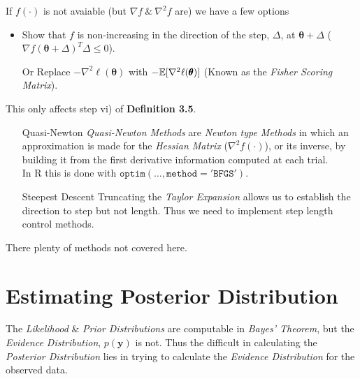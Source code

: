 \documentclass[11pt,a4paper]{article}
\begin{document}

If $f(\cdot)$ is not avaiable (but $\nabla f\ \&\ \nabla^2 f$ are) we have a few options
\begin{itemize}
	\item Show that $f$ is non-increasing in the direction of the step, $\Delta$, at $\pmb\theta+\Delta$ (\ie $\nabla f(\pmb\theta+\Delta)^T\Delta\leq0$).
	\item[Or] Replace $-\nabla^2 \ell(\pmb\theta)$ with $-\mathbb{E}[\nabla^2\ell(\pmb\theta)]$ (Known as the \textit{Fisher Scoring Matrix}).
\end{itemize}
\nb This only affects step vi) of \textbf{Definition 3.5}.\\

\begin{itemize}
	\item[Quasi-Newton] \textit{Quasi-Newton Methods} are \textit{Newton type Methods} in which an approximation is made for the \textit{Hessian Matrix} ($\nabla^2 f(\cdot)$), or its inverse, by building it from the first derivative information computed at each trial.\\
	\nb In R this is done with $\mathtt{optim(\dots,method='BFGS')}$.
	\item[Steepest Descent] Truncating the \textit{Taylor Expansion} allows us to establish the direction to step but not length. Thus we need to implement step length control methods.
\end{itemize}
\nb There plenty of methods not covered here.

\section{Estimating Posterior Distribution}
The \textit{Likelihood} \& \textit{Prior Distributions} are computable in \textit{Bayes' Theorem}, but the \textit{Evidence Distribution}, $p(\textbf{y})$ is not. Thus the difficult in calculating the \textit{Posterior Distribution} lies in trying to calculate the \textit{Evidence Distribution} for the observed data.\\

\end{document}
